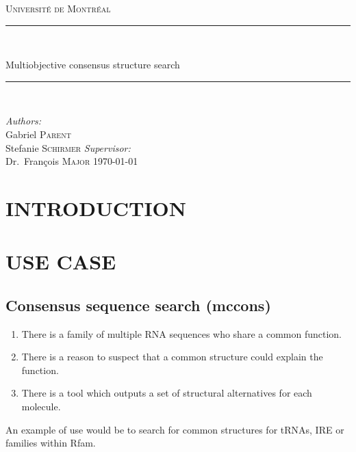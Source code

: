 \documentclass[a4paper, 12pt] {article}
\newcommand{\HRule}{\rule{\linewidth}{0.5mm}}
\begin{document}

\begin{titlepage}
\begin{center}
\textsc{\LARGE Université de Montréal}\\[1.5cm]

\HRule \\[0.4cm]

{\huge Multiobjective consensus structure search
\HRule \\[0.4cm]}
\vfill
\emph{Authors:}\\
Gabriel \textsc{Parent}\\
Stefanie \textsc {Schirmer}
\vfill
\emph{Supervisor:} \\
Dr.~François \textsc{Major}
\vfill
{\large \today}
\end{center}
\end{titlepage}


\section*{INTRODUCTION}

\noindent
\section*{USE CASE}
\subsection*{Consensus sequence search (mccons)}
\begin{enumerate}
  \item There is a family of multiple RNA sequences who share a common function.
  \item There is a reason to suspect that a common structure could explain the function. 
  \item There is a tool which outputs a set of structural alternatives for each molecule. 
\end{enumerate}
An example of use would be to search for common structures for tRNAs, IRE or families within Rfam.
\end{document}
